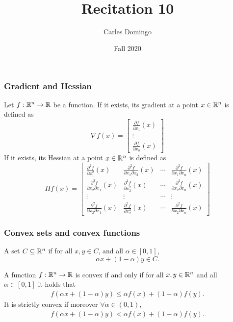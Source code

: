\documentclass{beamer}
\title{Recitation 10}
\author{Carles Domingo}
\date{Fall 2020}
\begin{document}
\frame{\titlepage} 

\setcounter{showProgressBar}{0}
\setcounter{showSlideNumbers}{1}

\begin{frame}[t]
\frametitle{Gradient and Hessian}
\vspace{-10pt}
\begin{definition}
Let $f : \mathbb{R}^n \rightarrow \mathbb{R}$ be a function. If it exists, its gradient at a point $x \in \mathbb{R}^n$ is defined as
\begin{equation*} 
\nabla f(x) = 
\begin{bmatrix}
\frac{\partial f}{\partial x_1}(x) \\
\vdots \\
\frac{\partial f}{\partial x_n}(x)
\end{bmatrix}
\end{equation*}
If it exists, its Hessian at a point $x \in \mathbb{R}^n$ is defined as
\begin{equation*} 
H f(x) = 
\begin{bmatrix}
\frac{\partial^2 f}{\partial x_1^2}(x) & \frac{\partial^2 f}{\partial x_1 \partial x_2}(x) & \cdots & \frac{\partial^2 f}{\partial x_1 \partial x_n}(x) \\ 
\frac{\partial^2 f}{\partial x_2 \partial x_1}(x) & \frac{\partial^2 f}{\partial x_2^2}(x) & \cdots & \frac{\partial^2 f}{\partial x_2 \partial x_n}(x) \\ 
\vdots &  \vdots & \cdots & \vdots \\ 
\frac{\partial^2 f}{\partial x_2 \partial x_1}(x) & \frac{\partial^2 f}{\partial x_2^2}(x) & \cdots & \frac{\partial^2 f}{\partial x_2 \partial x_n}(x)
\end{bmatrix}
\end{equation*}
\end{definition}
\end{frame}

\begin{frame}[t]
\frametitle{Convex sets and convex functions}
\vspace{-10pt}
\begin{definition}
A set $C \subseteq \mathbb{R}^n$ if for all $x,y \in C$, and all $\alpha \in [0,1]$,
\begin{equation*} 
\alpha x + (1-\alpha) y \in C.
\end{equation*}
\end{definition}

\begin{definition}
A function $f : \mathbb{R}^n \rightarrow \mathbb{R}$ is convex if and only if for all $x, y \in \mathbb{R}^n$ and all $\alpha \in [0,1]$ it holds that 
\begin{align}
f(\alpha x + (1-\alpha) y) \leq \alpha f(x) + (1-\alpha) f(y).
\end{align}
It is strictly convex if moreover $\forall \alpha \in (0,1)$,
\begin{align}
f(\alpha x + (1-\alpha) y) < \alpha f(x) + (1-\alpha) f(y).
\end{align}
\end{definition}
\end{frame}
\end{document}
